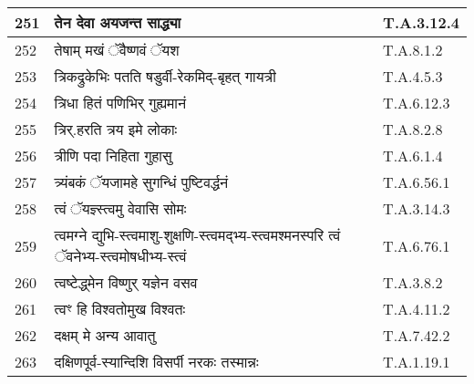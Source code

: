 \documentclass[17pt]{extarticle}
\begin{document}
\begin{longtable}{||p{0.4in}||p{4.9in}||p{0.9in}||}
    251 & तेन देवा अयजन्त साद्ध्या & T.A.3.12.4       \\
    
    \hline
        
    252 & तेषाम् मखं ॅवैष्णवं ॅयश & T.A.8.1.2       \\
    
    \hline
        
    253 & त्रिकद्रुकेभिः पतति षडुर्वी{-}रेकमिद्{-}बृहत् गायत्री & T.A.4.5.3       \\
    
    \hline
        
    254 & त्रिधा हितं पणिभिर् गुह्यमानं & T.A.6.12.3       \\
    
    \hline
        
    255 & त्रिर्.हरति त्रय इमे लोकाः & T.A.8.2.8       \\
    
    \hline
        
    256 & त्रीणि पदा निहिता गुहासु & T.A.6.1.4       \\
    
    \hline
        
    257 & त्र्यंबकं ॅयजामहे सुगन्धिं पुष्टिवर्द्धनं & T.A.6.56.1       \\
    
    \hline
        
    258 & त्वं ॅयज्ञ्स्त्वमु वेवासि सोमः & T.A.3.14.3       \\
    
    \hline
        
    259 & त्वमग्ने द्युभि{-}स्त्वमाशु{-}शुक्षणि{-}स्त्वमद्भ्य{-}स्त्वमश्मनस्परि त्वं ॅवनेभ्य{-}स्त्वमोषधीभ्य{-}स्त्वं & T.A.6.76.1       \\
    
    \hline
        
    260 & त्वष्टेद्ध्मेन विष्णुर् यज्ञेन वसव & T.A.3.8.2       \\
    
    \hline
        
    261 & त्वꣳ हि विश्वतोमुख विश्वतः & T.A.4.11.2       \\
    
    \hline
        
    262 & दक्षम् मे अन्य आवातु & T.A.7.42.2       \\
    
    \hline
        
    263 & दक्षिणपूर्व{-}स्यान्दिशि विसर्पी नरकः तस्मान्नः & T.A.1.19.1       \\
    

\end{longtable}
\end{document}

